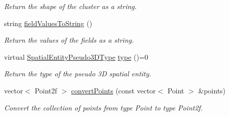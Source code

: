 \begin{DoxyCompactItemize}
\begin{DoxyCompactList}\small\item\em \-Return the shape of the cluster as a string. \end{DoxyCompactList}\item 
string \hyperlink{classmultiscale_1_1analysis_1_1SpatialEntityPseudo3D_a232a5e4991e59dfc685107982fcaf0ce}{field\-Values\-To\-String} ()
\begin{DoxyCompactList}\small\item\em \-Return the values of the fields as a string. \end{DoxyCompactList}\item 
virtual \hyperlink{namespacemultiscale_1_1analysis_a8f337e7ea9c75ff3ff2b3fe76fe7b5b6}{\-Spatial\-Entity\-Pseudo3\-D\-Type} \hyperlink{classmultiscale_1_1analysis_1_1SpatialEntityPseudo3D_ac0d4656a44cc724c2cc7d34d8b15dbd8}{type} ()=0
\begin{DoxyCompactList}\small\item\em \-Return the type of the pseudo 3\-D spatial entity. \end{DoxyCompactList}\item 
vector$<$ \-Point2f $>$ \hyperlink{classmultiscale_1_1analysis_1_1SpatialEntityPseudo3D_a2175fefa47f158b22872af80010543b1}{convert\-Points} (const vector$<$ \-Point $>$ \&points)
\begin{DoxyCompactList}\small\item\em \-Convert the collection of points from type \-Point to type \-Point2f. \end{DoxyCompactList}\end{DoxyCompactItemize}
